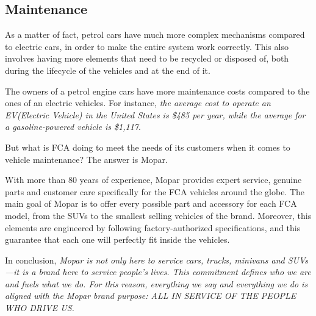 \subsection{Maintenance}

As a matter of fact, petrol cars have much more complex mechanisms compared to electric cars, in order to make the entire system work correctly. This also involves having more elements that need to be recycled or disposed of, both during the lifecycle of the vehicles and at the end of it.

The owners of a petrol engine cars have more maintenance costs compared to the ones of an electric vehicles. For instance, \emph{the average cost to operate an EV(Electric Vehicle) in the United States is \$485 per year, while the average for a gasoline-powered vehicle is \$1,117}\cite{maintenance_costs}. 

But what is FCA doing to meet the needs of its customers when it comes to vehicle maintenance? The answer is Mopar. 

With more than 80 years of experience, Mopar provides expert service, genuine parts and customer care specifically for the FCA vehicles around the globe\cite{maintenance_mopar}. 
The main goal of Mopar is to offer every possible part and accessory for each FCA model, from the SUVs to the smallest selling vehicles of the brand. Moreover, this elements are engineered by following factory-authorized specifications, and this guarantee that each one will perfectly fit inside the vehicles\cite{maintenance_mopar}.

In conclusion, \emph{Mopar is not only here to service cars, trucks, minivans and SUVs—it is a brand here to service people’s lives. This commitment defines who we are and fuels what we do. For this reason, everything we say and everything we do is aligned with the Mopar brand purpose:
ALL IN SERVICE OF THE PEOPLE WHO DRIVE US.}\cite{maintenance_mopar}